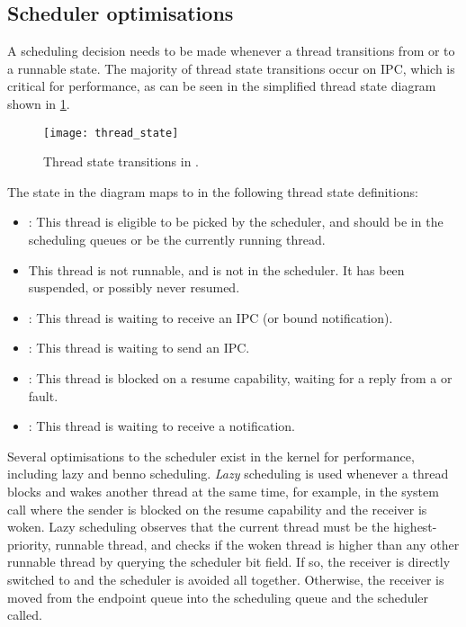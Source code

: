 \subsection{Scheduler optimisations}
\label{sec:sel4-scheduler-opt}

A scheduling decision needs to be made whenever a thread transitions from or to a runnable state.
The majority of thread state transitions occur on IPC, which is critical for performance, 
as can be seen in the simplified thread state diagram shown in \cref{f:thread_state}. 
\begin{figure}[h!tb]
    \centering
    \texttt{[image: thread\_state]}
    \caption{Thread state transitions in \selfour.}
    \label{f:thread_state}
\end{figure}
The  state in the diagram maps to  in the following thread
state definitions:
\begin{itemize}
    \item {}: This thread is eligible to be picked by the scheduler, and should be in the
        scheduling queues or be the currently running thread.
    \item {} This thread is not runnable, and is not in the scheduler. It has been
        suspended, or possibly never resumed. 
    \item {}: This thread is waiting to receive an IPC (or bound notification). 
    \item {}: This thread is waiting to send an IPC. 
    \item {}: This thread is blocked on a resume capability, waiting for a reply
        from a \call or fault.
    \item {}: This thread is waiting to receive a notification.
\end{itemize}

Several optimisations to the scheduler exist in the kernel for performance, including lazy and benno
scheduling. 
\emph{Lazy} scheduling is used whenever a thread blocks and wakes
another thread at the same time, for example, in the \call system call where the sender is
blocked on the resume capability and the receiver is woken. Lazy scheduling observes that the
current thread must be the highest-priority, runnable thread, and checks if the woken thread is
higher than any other runnable thread by querying the scheduler bit field. If so, the receiver is
directly switched to and the scheduler is avoided all together. Otherwise, the receiver is moved from
the endpoint queue into the scheduling queue and the scheduler called.

